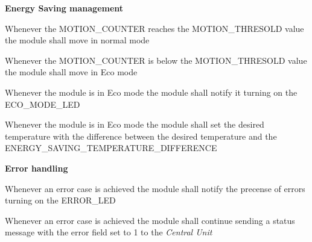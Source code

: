 \begin{req_enum}
	\item \textbf{Energy Saving management}
		\begin{req_enum}[label*=\arabic*.]
			\item Whenever the MOTION\_COUNTER reaches the MOTION\_THRESOLD value the module shall move in normal mode
			\item Whenever the MOTION\_COUNTER is below the MOTION\_THRESOLD value the module shall move in Eco mode
			\item Whenever the module is in Eco mode the module shall notify it turning on the ECO\_MODE\_LED
			\item Whenever the module is in Eco mode the module shall set the desired temperature with the difference between the desired temperature and the ENERGY\_SAVING\_TEMPERATURE\_DIFFERENCE
		\end{req_enum}

		\item \textbf{Error handling}
		\begin{req_enum}[label*=\arabic*.]
			\item Whenever an error case is achieved the module shall notify the precense of errors turning on the ERROR\_LED
			\item Whenever an error case is achieved the module shall continue sending a status message with the error field set to 1 to the \textit{Central Unit}
		\end{req_enum}

\end{req_enum}
